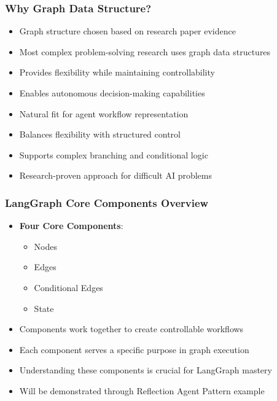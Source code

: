 \begin{frame}[fragile]\frametitle{Why Graph Data Structure?}
      \begin{itemize}
        \item Graph structure chosen based on research paper evidence
        \item Most complex problem-solving research uses graph data structures
        \item Provides flexibility while maintaining controllability
        \item Enables autonomous decision-making capabilities
        \item Natural fit for agent workflow representation
        \item Balances flexibility with structured control
        \item Supports complex branching and conditional logic
        \item Research-proven approach for difficult AI problems
      \end{itemize}
\end{frame}

\begin{frame}[fragile]\frametitle{LangGraph Core Components Overview}
      \begin{itemize}
        \item \textbf{Four Core Components}:
        \begin{itemize}
            \item Nodes
            \item Edges  
            \item Conditional Edges
            \item State
        \end{itemize}
        \item Components work together to create controllable workflows
        \item Each component serves a specific purpose in graph execution
        \item Understanding these components is crucial for LangGraph mastery
        \item Will be demonstrated through Reflection Agent Pattern example
      \end{itemize}
\end{frame}

